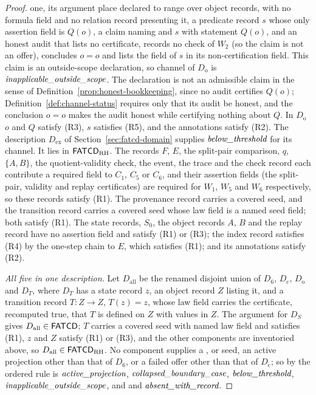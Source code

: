 \begin{proof}
one, its argument place declared to range over object records, with no formula field and no relation record presenting it, a predicate
record \(s\) whose only assertion field is \(Q(o)\), a claim naming \Ptwo{} and
\(s\) with statement \(Q(o)\), and an honest audit that lists no certificate,
records no check of \(W_2\) (so the claim is not an offer), concludes \(o=o\)
and lists the field of \(s\) in its non-certification field. This claim is an
outside-scope declaration, so channel \Ptwo{} of \(D_{\mathrm{o}}\) is
\(\textit{inapplicable\_\allowbreak outside\_\allowbreak scope}\). The declaration is not an admissible claim in the sense of
Definition~\ref{prop:honest-bookkeeping}, since no audit certifies \(Q(o)\);
Definition~\ref{def:channel-status} requires only that its audit be honest, and
the conclusion \(o=o\) makes the audit honest while certifying nothing about
\(Q\). In \(D_{\mathrm{o}}\) \(o\) and \(Q\)
satisfy (R3), \(s\) satisfies (R5), and the annotations satisfy (R2). The
description \(D_{\mathrm{ex}}\) of Section~\ref{sec:fatcd-domain} supplies
\(\textit{below\_\allowbreak threshold}\) for its \Pfour{} channel. It lies in \(\mathsf{FATCD}_{\mathrm{RH}}\). The records \(F\), \(E\), the
split-pair comparison, \(q\), \(\{A,B\}\), the quotient-validity check, the
event, the trace and the check record each contribute a required field to
\(C_1\), \(C_5\) or \(C_6\), and their assertion fields (the split-pair,
validity and replay certificates) are required for \(W_1\), \(W_5\) and \(W_6\)
respectively, so these records satisfy (R1). The provenance record carries a
covered \Psix{} seed, and the transition record carries a covered \Pfour{} seed
whose law field is a named seed field; both satisfy (R1). The state records,
\(S_0\), the object records \(A\), \(B\) and the replay record have no assertion field and satisfy (R1) or
(R3); the index record satisfies (R4) by the one-step chain to \(E\), which satisfies
(R1); and its annotations satisfy (R2).
\par\emph{All five in one description.} Let \(D_{\mathrm{all}}\) be the renamed disjoint union of \(D_6\),
\(D_{\mathrm c}\), \(D_{\mathrm o}\) and \(D_T\), where \(D_T\) has a state record
\(z\), an object record \(Z\) listing it, and a transition record \(T:Z\to Z\),
\(T(z)=z\), whose law field carries the certificate, recomputed true, that \(T\)
is defined on \(Z\) with values in \(Z\). The argument for \(D_S\) gives
\(D_{\mathrm{all}}\in\mathsf{FATCD}{}\); \(T\) carries a covered \Pfour{} seed with named
law field and satisfies (R1), \(z\) and \(Z\) satisfy (R1) or (R3), and the other
components are inventoried above, so \(D_{\mathrm{all}}\in\mathsf{FATCD}_{\mathrm{RH}}\).
No component supplies a \Pone{}, \Ptwo{} or \Pthree{} seed, an active projection
other than that of \(D_6\), or a failed offer other than that of
\(D_{\mathrm c}\); so by the ordered rule \Psix{} is \(\textit{active\_\allowbreak projection}\), \Pfive{}
\(\textit{collapsed\_\allowbreak boundary\_\allowbreak case}\), \Pfour{} \(\textit{below\_\allowbreak threshold}\), \Ptwo{} \(\textit{inapplicable\_\allowbreak outside\_\allowbreak scope}\), and \Pone{}
and \Pthree{} \(\textit{absent\_\allowbreak with\_\allowbreak record}\).
\end{proof}

